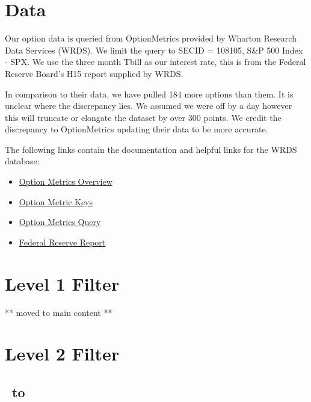 \begin{appendix}


\section{Data}\label{app:data}

Our option data is queried from OptionMetrics provided by Wharton Research Data Services (WRDS). We limit the query to SECID = 108105, S\&P 500 Index - SPX. We use the three month Tbill as our interest rate, this is from the Federal Reserve Board's H15 report supplied by WRDS. 

In comparison to their data, we have pulled 184 more options than them. It is unclear where the discrepancy lies. We assumed we were off by a day however this will truncate or elongate the dataset by over 300 points. We credit the discrepancy to OptionMetrics updating their data to be more accurate. 

The following links contain the documentation and helpful links for the WRDS database: 
\begin{itemize}
\item \href{https://wrds-www.wharton.upenn.edu/pages/support/manuals-and-overviews/optionmetrics/wrds-overview-optionmetrics/}{Option Metrics Overview} 
\item \href{https://wrds-www.wharton.upenn.edu/data-dictionary/optionm_all/opprcd2023/ }{Option Metric Keys}
\item \href{https://wrds-www.wharton.upenn.edu/pages/get-data/optionmetrics/ivy-db-us/options/option-prices/}{Option Metrics Query} 
\item \href{https://wrds-www.wharton.upenn.edu/data-dictionary/frb_all/rates_daily/}{Federal Reserve Report} 
\end{itemize}



\newpage

\section{Level 1 Filter}\label{app:lvl1}
** moved to main content **

\newpage

\section{Level 2 Filter}\label{app:lvl2}
\subsection{\STARTONE\ to \ENDONE }


\end{appendix}
